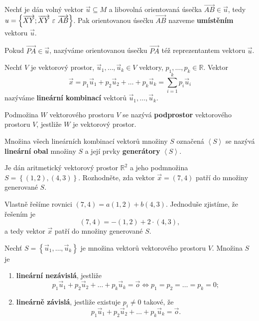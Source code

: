 \begin{definition}
Nechť je dán volný vektor $\vec u \subseteq M$ a libovolná orientovaná úsečka $\overrightarrow{AB} \in \vec u$, tedy
$u =\left  \{ \overrightarrow{XY}; \overrightarrow{XY} \operatorname{\,\varepsilon\,} \overrightarrow{AB} \right \}$. Pak orientovanou úsečku $\overrightarrow{AB}$ nazveme \textbf{umístěním} vektoru $\vec u$.
\end{definition}

\begin{definition}
    Pokud $\overrightarrow{PA}\in \vec u$, nazýváme orientovanou úsečku $\overrightarrow{PA}$ též reprezentantem vektoru $\vec u$.
\end{definition}

\begin{definition}
    Nechť $V$ je vektorový prostor, $\vec u_1,\dots, \vec u_k\in V$ vektory, $p_1,\dots,
    p_k\in \mathbb R.$ Vektor
    $$\vec x = p_1\vec u_1 + p_2\vec u_2 + \dots + p_k\vec u_k = \sum_{i=1}^{k} p_i\vec u_i$$
    nazýváme \textbf{lineární kombinací} vektorů $\vec u_1,\dots, \vec u_k.$
\end{definition}

\begin{definition}
    Podmožina $W$ vektorového prostoru $V$ se nazývá \textbf{podprostor} vektorového
    prostoru $V$, jestliže $W$ je vektorový prostor.
\end{definition}

\begin{definition}
    Množina všech lineárních kombinací vektorů množiny $S$ označená $\left<  S \right>$ se nazývá \textbf{lineární
    obal} množiny $S$ a její prvky \textbf{generátory} $\left<  S \right>$.
\end{definition}

\begin{priklad}
Je dán aritmetický vektorový prostor $\mathbb R^{2}$ a jeho podmnožina $S=\left \{ (1,2), (4,3) \right \}. $
Rozhodněte, zda vektor $\vec x = (7,4)$ patří do množiny generované $S$.
\end{priklad}

\begin{reseni}
Vlastně řešíme rovnici $(7,4)=a(1,2)+b(4,3).$ Jednoduše zjistíme, že řešením je
$$
    (7,4) = -(1,2) + 2\cdot (4,3),
$$
a tedy vektor $\vec x$ patří do množiny generované $S$.
\end{reseni}

\begin{definition}
    Nechť $S= \left \{ \vec u_1, \dots, \vec u_k \right \} $ je množina vektorů vektorového prostoru $V$. Množina $S$ je
   	\begin{enumerate}[$i.$]
    \item \textbf{lineární nezávislá}, jestliže
    $$p_1\vec u_1 + p_2\vec u_2 + \dots + p_k\vec u_k = \vec o \iff p_1 = p_2 = \dots = p_k = 0;$$
   	\item \textbf{lineárně závislá}, jestliže existuje $p_i\ne 0$ takové, že
    $$ p_1\vec u_1 + p_2\vec u_2 + \dots + p_k\vec u_k = \vec o.$$
    \end{enumerate}
\end{definition}

